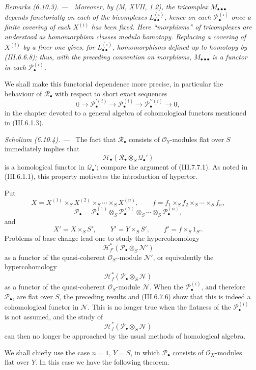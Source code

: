 \documentclass[10pt,oneside]{book}
\newcommand{\sh}[1]{\mathscr{#1}}
\newcommand{\sref}[2][]{(#2)}
\newenvironment{remarks}[1][]{\par\medskip\noindent\itshape Remarks (#1). ---\ }{\par}
\newenvironment{scholium}[1][]{\par\medskip\noindent\textit{Scholium (#1). ---\ }}{\par}
\begin{document}
\begin{remarks}[6.10.3]
Moreover, by (M, XVII, 1.2), the tricomplex
$M_{\bullet\bullet\bullet}$ depends functorially on each of the
bicomplexes $L_{\bullet\bullet}^{(i)}$, hence on each
$\sh P_\bullet^{(i)}$ once a finite covering of each
$X^{(i)}$ has been fixed.  Here ``morphisms'' of tricomplexes
are understood as homomorphism classes modulo homotopy.
Replacing a covering of $X^{(i)}$ by a finer one gives, for
$L_{\bullet\bullet}^{(i)}$, homomorphisms defined up to homotopy
by \sref{III.6.6.8}; thus, with the preceding convention on
morphisms, $M_{\bullet\bullet\bullet}$ is a functor in each
$\sh P_\bullet^{(i)}$.

We shall make this functorial dependence more precise, in
particular the behaviour of $\sh R_\bullet$ with respect to
short exact sequences
\[
  0\longrightarrow\sh P_\bullet^{\prime(i)}
  \longrightarrow\sh P_\bullet^{(i)}
  \longrightarrow\sh P_\bullet^{\prime\prime(i)}
  \longrightarrow0,
\]
in the chapter devoted to a general algebra of cohomological
functors mentioned in \sref{III.6.1.3}.
\end{remarks}

\begin{scholium}[6.10.4]
\label{III.6.10.4}
The fact that $\sh R_\bullet$ consists of $\sh O_Y$-modules
flat over $S$ immediately implies that
\[
  \sh H_\bullet
  (\sh R_\bullet\otimes_S\sh Q_\bullet')
\]
is a homological functor in $\sh Q_\bullet'$; compare the
argument of \sref{III.7.7.1}.  As noted in
\sref{III.6.1.1}, this property motivates the introduction of
hypertor.

Put
\[
  X=X^{(1)}\times_SX^{(2)}\times_S\cdots\times_SX^{(n)},
  \qquad
  f=f_1\times_Sf_2\times_S\cdots\times_Sf_n,
\]
\[
  \sh P_\bullet
  =
  \sh P_\bullet^{(1)}
  \otimes_S\sh P_\bullet^{(2)}
  \otimes_S\cdots\otimes_S\sh P_\bullet^{(n)},
\]
and
\[
  X'=X\times_SS',
  \qquad
  Y'=Y\times_SS',
  \qquad
  f'=f\times_S1_{S'}.
\]
Problems of base change lead one to study the hypercohomology
\[
  \sh H^*_{f'}
  (\sh P_\bullet\otimes_S\sh N')
\]
as a functor of the quasi-coherent $\sh O_{S'}$-module
$\sh N'$, or equivalently the hypercohomology
\[
  \sh H^*_f
  (\sh P_\bullet\otimes_S\sh N)
\]
as a functor of the quasi-coherent $\sh O_S$-module $\sh N$.
When the $\sh P_\bullet^{(i)}$, and therefore
$\sh P_\bullet$, are flat over $S$, the preceding results and
\sref{III.6.7.6} show that this is indeed a cohomological
functor in $\sh N$.  This is no longer true when the flatness
of the $\sh P_\bullet^{(i)}$ is not assumed, and the study of
\[
  \sh H^*_f(\sh P_\bullet\otimes_S\sh N)
\]
can then no longer be approached by the usual methods of
homological algebra.

We shall chiefly use the case $n=1$, $Y=S$, in which
$\sh P_\bullet$ consists of $\sh O_X$-modules flat over $Y$.
In this case we have the following theorem.
\end{scholium}
\end{document}
